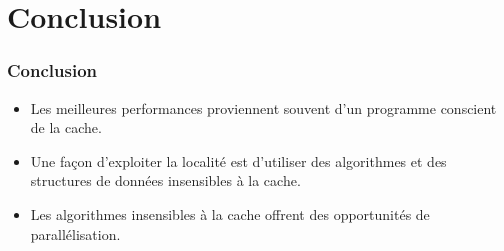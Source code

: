 \documentclass{beamer}
\begin{document}
\section{Conclusion}
\begin{frame}
\frametitle{Conclusion}
\begin{itemize}
\item Les meilleures performances proviennent souvent d'un programme conscient de la cache.
\item<2-> Une façon d'exploiter la localité est d'utiliser des algorithmes et des structures de données insensibles à la cache.
\item<3-> Les algorithmes insensibles à la cache offrent des opportunités de parallélisation.
\end{itemize}
\end{frame}
\end{document}
